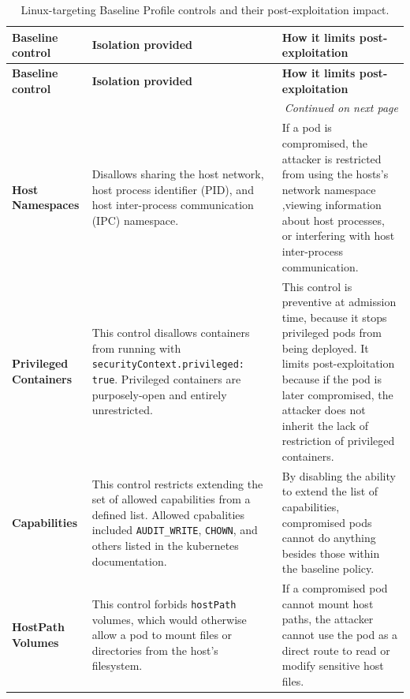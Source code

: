 \documentclass[11pt,a4paper]{article}
\begin{document}
	\begin{longtable}{|p{2.5cm}|p{5.4cm}|p{6.2cm}|}
		\caption{Linux-targeting Baseline Profile controls and their post-exploitation impact.}
		\label{tab:baseline-profile-controls} \\
		
		\hline
		\textbf{Baseline control} & \textbf{Isolation provided} & \textbf{How it limits post-exploitation} \\
		\hline
		\endfirsthead
		
		\hline
		\textbf{Baseline control} & \textbf{Isolation provided} & \textbf{How it limits post-exploitation} \\
		\hline
		\endhead
		
		\hline
		\multicolumn{3}{r}{\textit{Continued on next page}} \\
		\endfoot
		
		\hline
		\endlastfoot
		
		\textbf{Host Namespaces} &
		Disallows sharing the host network, host process identifier (PID), and host inter-process communication (IPC) namespace. &
		If a pod is compromised, the attacker is restricted from using the hosts's network namespace ,viewing information about host processes, or interfering with host inter-process communication. \\
		\hline
		
		\textbf{Privileged Containers} &
		This control disallows containers from running with \texttt{securityContext.privileged: true}. Privileged containers are purposely-open and entirely unrestricted.  & 
		This control is preventive at admission time, because it stops privileged pods from being deployed. It limits post-exploitation because if the pod is later compromised, the attacker does not inherit the lack of restriction of privileged containers.  \\
		\hline
		
		\textbf{Capabilities} &
		This control restricts extending the set of allowed capabilities from a defined list. Allowed cpabalities included \texttt{AUDIT\_WRITE}, \texttt{CHOWN}, and others listed in the kubernetes documentation.&
		By disabling the ability to extend the list of capabilities, compromised pods cannot do anything besides those within the baseline policy. \\
		\hline
		
		\textbf{HostPath Volumes} &
		This control forbids \texttt{hostPath} volumes, which would otherwise allow a pod to mount files or directories from the host's filesystem. &
		If a compromised pod cannot mount host paths, the attacker cannot use the pod as a direct route to read or modify sensitive host files.\\
		\hline
		

\end{longtable}
\end{document}
